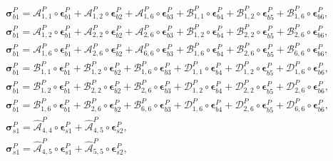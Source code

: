 \begin{eqnarray}
	\label{eq:stress_b}
	\boldsymbol{\sigma}^P_{b1} = \mathcal{A}^P_{1,1}\circ\boldsymbol{\epsilon}^P_{b1} +  \mathcal{A}^P_{1,2}\circ\boldsymbol{\epsilon}^P_{b2} + \mathcal{A}^P_{1,6}\circ\boldsymbol{\epsilon}^P_{b3} +
	\mathcal{B}^P_{1,1}\circ\boldsymbol{\epsilon}^P_{b4} +  \mathcal{B}^P_{1,2}\circ\boldsymbol{\epsilon}^P_{b5} + \mathcal{B}^P_{1,6}\circ\boldsymbol{\epsilon}^P_{b6},\\	
	\boldsymbol{\sigma}^P_{b1} = \mathcal{A}^P_{1,2}\circ\boldsymbol{\epsilon}^P_{b1} +  \mathcal{A}^P_{2,2}\circ\boldsymbol{\epsilon}^P_{b2} + \mathcal{A}^P_{2,6}\circ\boldsymbol{\epsilon}^P_{b3} +
	\mathcal{B}^P_{1,2}\circ\boldsymbol{\epsilon}^P_{b4} +  \mathcal{B}^P_{2,2}\circ\boldsymbol{\epsilon}^P_{b5} + \mathcal{B}^P_{2,6}\circ\boldsymbol{\epsilon}^P_{b6},\\
	\boldsymbol{\sigma}^P_{b1} = \mathcal{A}^P_{1,6}\circ\boldsymbol{\epsilon}^P_{b1} +  \mathcal{A}^P_{2,6}\circ\boldsymbol{\epsilon}^P_{b2} + \mathcal{A}^P_{6,6}\circ\boldsymbol{\epsilon}^P_{b3} +
	\mathcal{B}^P_{1,6}\circ\boldsymbol{\epsilon}^P_{b4} +  \mathcal{B}^P_{2,6}\circ\boldsymbol{\epsilon}^P_{b5} + \mathcal{B}^P_{6,6}\circ\boldsymbol{\epsilon}^P_{b6},\\
	\boldsymbol{\sigma}^P_{b1} = \mathcal{B}^P_{1,1}\circ\boldsymbol{\epsilon}^P_{b1} +  \mathcal{B}^P_{1,2}\circ\boldsymbol{\epsilon}^P_{b2} + \mathcal{B}^P_{1,6}\circ\boldsymbol{\epsilon}^P_{b3} +
	\mathcal{D}^P_{1,1}\circ\boldsymbol{\epsilon}^P_{b4} +  \mathcal{D}^P_{1,2}\circ\boldsymbol{\epsilon}^P_{b5} + \mathcal{D}^P_{1,6}\circ\boldsymbol{\epsilon}^P_{b6},\\
	\boldsymbol{\sigma}^P_{b1} = \mathcal{B}^P_{1,2}\circ\boldsymbol{\epsilon}^P_{b1} +  \mathcal{B}^P_{2,2}\circ\boldsymbol{\epsilon}^P_{b2} + \mathcal{B}^P_{2,6}\circ\boldsymbol{\epsilon}^P_{b3} +
	\mathcal{D}^P_{1,2}\circ\boldsymbol{\epsilon}^P_{b4} +  \mathcal{D}^P_{2,2}\circ\boldsymbol{\epsilon}^P_{b5} + \mathcal{D}^P_{2,6}\circ\boldsymbol{\epsilon}^P_{b6},\\
	\boldsymbol{\sigma}^P_{b1} = \mathcal{B}^P_{1,6}\circ\boldsymbol{\epsilon}^P_{b1} +  \mathcal{B}^P_{2,6}\circ\boldsymbol{\epsilon}^P_{b2} + \mathcal{B}^P_{6,6}\circ\boldsymbol{\epsilon}^P_{b3} +
	\mathcal{D}^P_{1,6}\circ\boldsymbol{\epsilon}^P_{b4} +  \mathcal{D}^P_{2,6}\circ\boldsymbol{\epsilon}^P_{b5} + \mathcal{D}^P_{6,6}\circ\boldsymbol{\epsilon}^P_{b6},\\
	\boldsymbol{\sigma}^P_{s1} = \hat{\mathcal{A}}^P_{4,4}\circ\boldsymbol{\epsilon}^P_{s1} +  \hat{\mathcal{A}}^P_{4,5}\circ\boldsymbol{\epsilon}^P_{s2},\\ \boldsymbol{\sigma}^P_{s1} = \hat{\mathcal{A}}^P_{4,5}\circ\boldsymbol{\epsilon}^P_{s1} +  \hat{\mathcal{A}}^P_{5,5}\circ\boldsymbol{\epsilon}^P_{s2},
\end{eqnarray}
